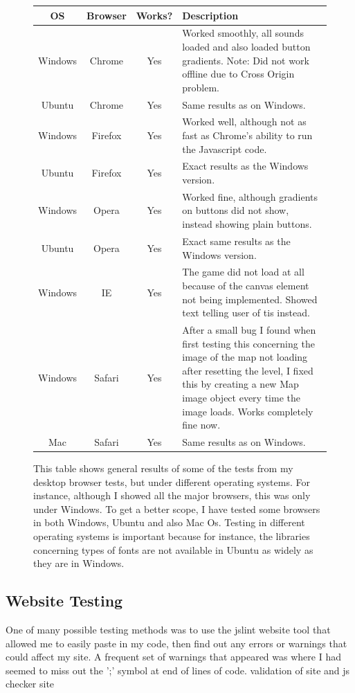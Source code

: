\documentclass[a4paper]{article}
\begin{document}
\begin{figure}[!ht]
\centering
\begin{tabular}{|c | c | c | p{8cm}|}

\hline

OS & Browser & Works? & Description \\

\hline
Windows & Chrome & Yes & Worked smoothly, all sounds loaded and also loaded
button gradients. Note: Did not work offline due to Cross Origin problem.\\
Ubuntu & Chrome & Yes & Same results as on Windows.\\
Windows & Firefox & Yes & Worked well, although not as fast as Chrome's ability
to run the Javascript code.\\
Ubuntu & Firefox & Yes & Exact results as the Windows version.\\
Windows & Opera & Yes & Worked fine, although gradients on buttons did not show,
instead showing plain buttons.\\
Ubuntu & Opera & Yes & Exact same results as the Windows version.\\
Windows & IE & Yes & The game did not load at all because of the canvas element
not being implemented. Showed text telling user of tis instead.\\
Windows & Safari & Yes & After a small bug I found when first testing this
concerning the image of the map not loading after resetting the level, I fixed
this by creating a new Map image object every time the image loads. Works
completely fine now.\\
Mac & Safari & Yes & Same results as on Windows.\\
\hline


\end{tabular}
\caption{This table shows general results of some of the tests from my desktop
browser tests, but under different operating systems. For instance, although I
showed all the major browsers, this was only under Windows. To get a better
scope, I have tested some browsers in both Windows, Ubuntu and also Mac Os.
Testing in different operating systems is important because for instance, the
libraries concerning types of fonts are not available in Ubuntu as widely as
they are in Windows.}

\end{figure}
\clearpage

\subsection{Website Testing}
One of many possible testing methods was to use the jslint website \cite{jslint}
tool that allowed me to easily paste in my code, then find out any errors or
warnings that could affect my site. A frequent set of warnings that appeared was
where I had seemed to miss out the ';' symbol at end of lines of code.
validation of site and js checker site
\end{document}

